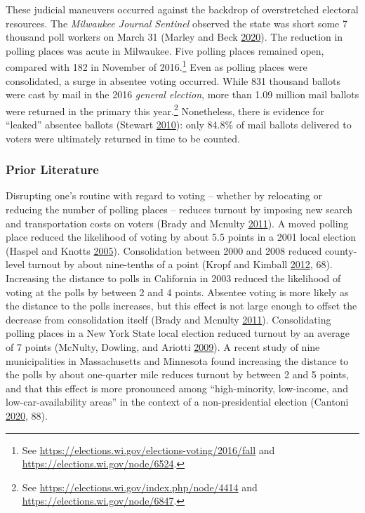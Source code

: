 \documentclass[
  12pt,
]{article}
\begin{document}
These judicial maneuvers occurred against the backdrop of overstretched electoral resources. The \emph{Milwaukee Journal Sentinel} observed the state was short some 7 thousand poll workers on March 31 (Marley and Beck \protect\hyperlink{ref-Marley2020}{2020}). The reduction in polling places was acute in Milwaukee. Five polling places remained open, compared with 182 in November of 2016.\footnote{See \url{https://elections.wi.gov/elections-voting/2016/fall} and \url{https://elections.wi.gov/node/6524}.} Even as polling places were consolidated, a surge in absentee voting occurred. While 831 thousand ballots were cast by mail in the 2016 \emph{general election}, more than 1.09 million mail ballots were returned in the primary this year.\footnote{See \url{https://elections.wi.gov/index.php/node/4414} and \url{https://elections.wi.gov/node/6847}.} Nonetheless, there is evidence for ``leaked'' absentee ballots (Stewart \protect\hyperlink{ref-Stewart2010}{2010}): only 84.8\% of mail ballots delivered to voters were ultimately returned in time to be counted.

\hypertarget{prior-literature}{%
\subsubsection*{Prior Literature}\label{prior-literature}}

Disrupting one's routine with regard to voting -- whether by relocating or reducing the number of polling places -- reduces turnout by imposing new search and transportation costs on voters (Brady and Mcnulty \protect\hyperlink{ref-Brady2011}{2011}). A moved polling place reduced the likelihood of voting by about 5.5 points in a 2001 local election (Haspel and Knotts \protect\hyperlink{ref-Haspel2005}{2005}). Consolidation between 2000 and 2008 reduced county-level turnout by about nine-tenths of a point (Kropf and Kimball \protect\hyperlink{ref-Kropf2012}{2012}, 68). Increasing the distance to polls in California in 2003 reduced the likelihood of voting at the polls by between 2 and 4 points. Absentee voting is more likely as the distance to the polls increases, but this effect is not large enough to offset the decrease from consolidation itself (Brady and Mcnulty \protect\hyperlink{ref-Brady2011}{2011}). Consolidating polling places in a New York State local election reduced turnout by an average of 7 points (McNulty, Dowling, and Ariotti \protect\hyperlink{ref-McNulty2009}{2009}). A recent study of nine municipalities in Massachusetts and Minnesota found increasing the distance to the polls by about one-quarter mile reduces turnout by between 2 and 5 points, and that this effect is more pronounced among ``high-minority, ­low-income, and low-car-availability areas'' in the context of a non-presidential election (Cantoni \protect\hyperlink{ref-Cantoni2020}{2020}, 88).
\end{document}
